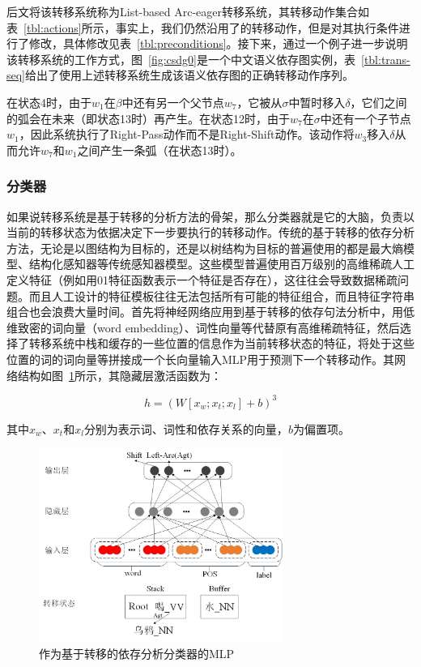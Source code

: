 后文将该转移系统称为List-based Arc-eager转移系统，其转移动作集合如表~\ref{tbl:actions}所示，事实上，我们仍然沿用了的转移动作，但是对其执行条件进行了修改，具体修改见表~\ref{tbl:preconditions}。接下来，通过一个例子进一步说明该转移系统的工作方式，图~\ref{fig:csdg0}是一个中文语义依存图实例，表~\ref{tbl:trans-seq}给出了使用上述转移系统生成该语义依存图的正确转移动作序列。

在状态4时，由于$w_1$在$\beta$中还有另一个父节点$w_7$，它被从$\sigma$中暂时移入$\delta$，它们之间的弧会在未来（即状态13时）再产生。在状态12时，由于$w_7$在$\sigma$中还有一个子节点$w_1$，因此系统执行了Right-Pass动作而不是Right-Shift动作。该动作将$w_3$移入$\delta$从而允许$w_7$和$w_1$之间产生一条弧（在状态13时）。

\subsubsection*{分类器}

如果说转移系统是基于转移的分析方法的骨架，那么分类器就是它的大脑，负责以当前的转移状态为依据决定下一步要执行的转移动作。传统的基于转移的依存分析方法，无论是以图结构为目标的，还是以树结构为目标的普遍使用的都是最大熵模型、结构化感知器等传统感知器模型。这些模型普遍使用百万级别的高维稀疏人工定义特征（例如用01特征函数表示一个特征是否存在），这往往会导致数据稀疏问题。而且人工设计的特征模板往往无法包括所有可能的特征组合，而且特征字符串组合也会浪费大量时间。首先将神经网络应用到基于转移的依存句法分析中，用低维致密的词向量（word embedding）、词性向量等代替原有高维稀疏特征，然后选择了转移系统中栈和缓存的一些位置的信息作为当前转移状态的特征，将处于这些位置的词的词向量等拼接成一个长向量输入MLP用于预测下一个转移动作。其网络结构如图~\ref{fig:chen2014mlp}所示，其隐藏层激活函数为：

\vspace{-0.6em}

\begin{equation}
h=(W[x_w;x_t;x_l ]+b)^3
\end{equation}

其中$x_w$、$x_t$和$x_l$分别为表示词、词性和依存关系的向量，$b$为偏置项。

\begin{figure}[hbtp]
	\centering
	\includegraphics[width=80mm]{picture/chen2014mlp.jpg}
	\caption{作为基于转移的依存分析分类器的MLP}
	\label{fig:chen2014mlp}
\end{figure}

